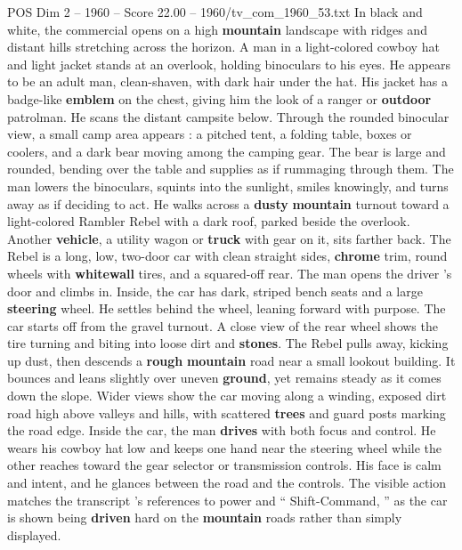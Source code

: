 \begin{textsample}{POS Dim 2 – 1960 – Score 22.00 – 1960/tv\_com\_1960\_53.txt}  \label{ex:f2_pos_007}
In black and white, the commercial opens on a high \textbf{mountain} landscape with ridges and distant hills stretching across the horizon.
A man in a light-colored cowboy hat and light jacket stands at an overlook, holding binoculars to his eyes.
He appears to be an adult man, clean-shaven, with dark hair under the hat.
His jacket has a badge-like \textbf{emblem} on the chest, giving him the look of a ranger or \textbf{outdoor} patrolman.
He scans the distant campsite below.
Through the rounded binocular view, a small camp area appears : a pitched tent, a folding table, boxes or coolers, and a dark bear moving among the camping gear.
The bear is large and rounded, bending over the table and supplies as if rummaging through them.
The man lowers the binoculars, squints into the sunlight, smiles knowingly, and turns away as if deciding to act.
He walks across a \textbf{dusty} \textbf{mountain} turnout toward a light-colored Rambler Rebel with a dark roof, parked beside the overlook.
Another \textbf{vehicle}, a utility wagon or \textbf{truck} with gear on it, sits farther back.
The Rebel is a long, low, two-door car with clean straight sides, \textbf{chrome} trim, round wheels with \textbf{whitewall} tires, and a squared-off rear.
The man opens the driver ’s door and climbs in.
Inside, the car has dark, striped bench seats and a large \textbf{steering} wheel.
He settles behind the wheel, leaning forward with purpose.
The car starts off from the gravel turnout.
A close view of the rear wheel shows the tire turning and biting into loose dirt and \textbf{stones}.
The Rebel pulls away, kicking up dust, then descends a \textbf{rough} \textbf{mountain} road near a small lookout building.
It bounces and leans slightly over uneven \textbf{ground}, yet remains steady as it comes down the slope.
Wider views show the car moving along a winding, exposed dirt road high above valleys and hills, with scattered \textbf{trees} and guard posts marking the road edge.
Inside the car, the man \textbf{drives} with both focus and control.
He wears his cowboy hat low and keeps one hand near the steering wheel while the other reaches toward the gear selector or transmission controls.
His face is calm and intent, and he glances between the road and the controls.
The visible action matches the transcript ’s references to power and “ Shift-Command, ” as the car is shown being \textbf{driven} hard on the \textbf{mountain} roads rather than simply displayed.

\end{textsample}

